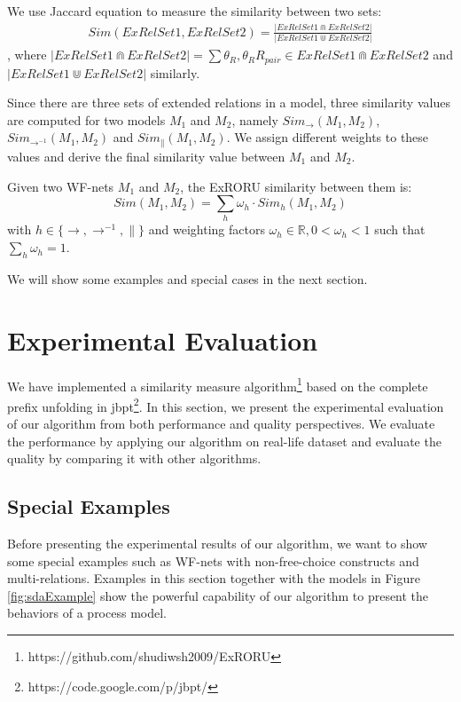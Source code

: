 \documentclass{llncs}
\begin{document}
We use Jaccard equation to measure the similarity between two sets:
\begin{equation}
	\begin{aligned}
		Sim(ExRelSet1,ExRelSet2)=\frac{|ExRelSet1\Cap ExRelSet2|}{|ExRelSet1\Cup ExRelSet2|}
	\end{aligned}
\end{equation}
, where $|ExRelSet1\Cap ExRelSet2|=\sum\theta_{R},\theta_{R}R_{pair}\in ExRelSet1\Cap ExRelSet2$ and $|ExRelSet1\Cup ExRelSet2|$ similarly.

Since there are three sets of extended relations in a model, three similarity values are computed for two models $M_{1}$ and $M_{2}$, namely $Sim_{\rightarrow}(M_{1},M_{2})$, $Sim_{\rightarrow^{-1}}(M_{1},M_{2})$ and $Sim_{\parallel}(M_{1},M_{2})$. We assign different weights to these values and derive the final similarity value between $M_{1}$ and $M_{2}$.

\begin{definition}\label{def:similarity}
Given two WF-nets $M_{1}$ and $M_{2}$, the ExRORU similarity between them is:\\
\begin{equation}\label{eq:similarity}
Sim(M_{1},M_{2})=\sum_{h}\omega_{h}\cdot Sim_{h}(M_{1},M_{2})
\end{equation}
with $h\in\{\rightarrow,\rightarrow^{-1},\parallel\}$ and weighting factors $\omega_{h}\in\mathbb{R},0<\omega_{h}<1$ such that $\sum\limits_{h}\omega_{h}=1$.
\end{definition}

We will show some examples and special cases in the next section.

\section{Experimental Evaluation}\label{sec:experiments}
We have implemented a similarity measure algorithm\footnote{https://github.com/shudiwsh2009/ExRORU} based on the complete prefix unfolding in jbpt\footnote{https://code.google.com/p/jbpt/}. In this section, we present the experimental evaluation of our algorithm from both performance and quality perspectives. We evaluate the performance by applying our algorithm on real-life dataset and evaluate the quality by comparing it with other algorithms.

\subsection{Special Examples}\label{subsec:specialExamples}
Before presenting the experimental results of our algorithm, we want to show some special examples such as WF-nets with non-free-choice constructs and multi-relations. Examples in this section together with the models in Figure \ref{fig:sdaExample} show the powerful capability of our algorithm to present the behaviors of a process model.
\end{document}
